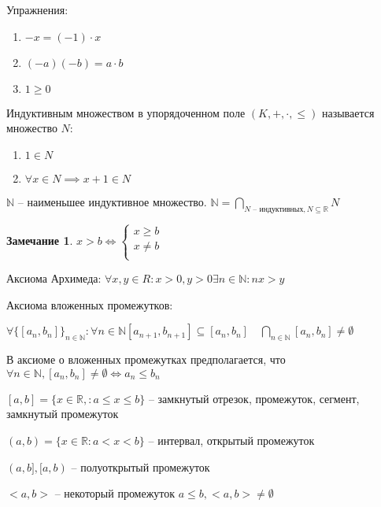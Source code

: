 \documentclass{book}
\newcommand\N{\ensuremath{\mathbb{N}}}
\newcommand\R{\ensuremath{\mathbb{R}}}
\renewcommand\O{\ensuremath{\emptyset}}
\theoremstyle{definition}
\newtheorem*{note}{Замечание}
\begin{document}
        Упражнения:
        \begin{enumerate}
            \item $-x = (-1)\cdot x$
            \item $(-a)(-b) = a\cdot b$
            \item $1\geqslant 0$
        \end{enumerate}
        \begin{definition}
            Индуктивным множеством в упорядоченном поле $(K, +, \cdot , \leqslant )$ называется множество $N$:
           \begin{enumerate}
               \item $1\in N$
               \item $\forall x\in N \implies  x+1\in N$
           \end{enumerate}

           $\N $ -- наименьшее индуктивное множество. $\N  = \bigcap\limits_{N\text{ -- индуктивных}, N\subseteq \R}N $
        \end{definition}
        \begin{note}
            $x>b \iff \begin{cases}
                x\geqslant b\\
                x\neq b\\
            \end{cases}$
        \end{note}
        Аксиома Архимеда: $\forall x, y\in R: x>0, y>0 \exists  n\in \N : nx>y$

        Аксиома вложенных промежутков: 
        
        $\forall \{[a_n, b_n]\}_{n\in \N }: \forall n\in \N [a_{n+1}, b_{n+1}] \subseteq [a_n, b_n]\quad \bigcap\limits_{n\in \N } [a_n, b_n]\neq \O  $

        В аксиоме о вложенных промежутках предполагается, что $\forall  n\in \N , [a_n, b_n] \neq \O  \iff  a_n \leqslant  b_n$

        $[a,b] = \{x\in \R,: a\leqslant x\leqslant b\}$ -- замкнутый отрезок, промежуток, сегмент, замкнутый промежуток

        $(a,b) = \{x\in \R: a<x<b\}$ -- интервал, открытый промежуток

        $(a,b], [a,b)$ -- полуоткрытый промежуток

        $<a,b>$ -- некоторый промежуток $a\leqslant b, <a,b> \neq \O $
\end{document}
